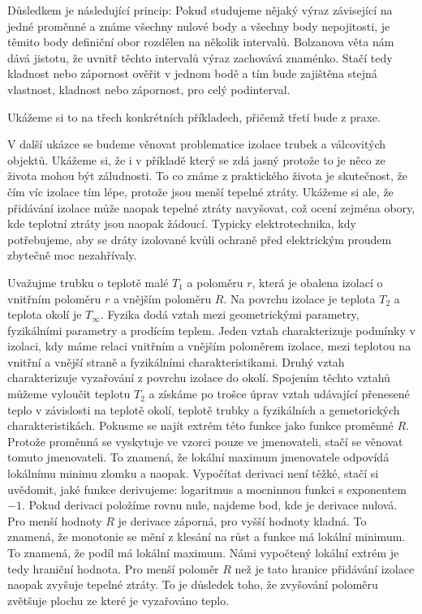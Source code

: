 \documentclass[12pt]{article}
\begin{document}
Důsledkem je následující princip: Pokud studujeme nějaký výraz závisející na jedné proměnné a známe všechny nulové body a všechny body nepojitosti, je těmito body definiční obor rozdělen na několik intervalů. Bolzanova věta nám dává jistotu, že uvnitř těchto intervalů výraz zachovává znaménko. Stačí tedy kladnost nebo zápornost ověřit v jednom bodě a tím bude zajištěna stejná vlastnost, kladnost nebo zápornost, pro celý podinterval. 

Ukážeme si to na třech konkrétních příkladech, přičemž třetí bude z praxe.

V další ukázce se budeme věnovat problematice izolace trubek a válcovitých objektů. Ukážeme si, že i v příkladě který se zdá jasný protože to je něco ze života mohou být záludnosti. To co známe z praktického života je skutečnost, že čím víc izolace tím lépe, protože jsou menší tepelné ztráty. Ukážeme si ale, že přidávání izolace může naopak tepelné ztráty navyšovat, což ocení zejména obory, kde teplotní ztráty jsou naopak žádoucí. Typicky elektrotechnika, kdy potřebujeme, aby se dráty izolované kvůli ochraně před elektrickým proudem zbytečně moc nezahřívaly.

Uvažujme trubku o teplotě malé $T_1$ a poloměru $r$, která je obalena izolací o vnitřním poloměru $r$ a vnějším poloměru $R$. Na povrchu izolace je teplota $T_2$ a teplota okolí je $T_\infty$. Fyzika dodá vztah mezi geometrickými parametry, fyzikálními parametry a prodícím teplem. Jeden vztah charakterizuje podmínky v izolaci, kdy máme relaci vnitřním a vnějším poloměrem izolace, mezi teplotou na vnitřní a vnější straně a fyzikálními charakteristikami. Druhý vztah charakterizuje vyzařování z povrchu izolace do okolí. Spojením těchto vztahů můžeme vyloučit teplotu $T_2$ a získáme po trošce úprav vztah udávající přenesené teplo v závislosti na teplotě okolí, teplotě trubky a fyzikálních a gemetorických charakteristikách.
Pokusme se najít extrém této funkce jako funkce proměnné $R$. Protože proměnná se vyskytuje ve vzorci pouze ve jmenovateli, stačí se věnovat tomuto jmenovateli. To znamená, že lokální maximum jmenovatele odpovídá lokálnímu minimu zlomku a naopak. Vypočítat derivaci není těžké, stačí si uvědomit, jaké funkce derivujeme: logaritmus a mocninnou funkci s exponentem $-1$. Pokud derivaci položíme rovnu nule, najdeme bod, kde je derivace nulová. Pro menší hodnoty $R$ je derivace záporná, pro vyšší hodnoty kladná. To znamená, že monotonie se mění z klesání na růst a funkce má lokální minimum. To znamená, že podíl má lokální maximum. Námi vypočtený lokální extrém je tedy hraniční hodnota. Pro menší poloměr $R$ než je tato hranice přidávání izolace naopak zvyšuje tepelné ztráty. To je důsledek toho, že zvyšování poloměru zvětšuje plochu ze které je vyzařováno teplo.
\end{document}
